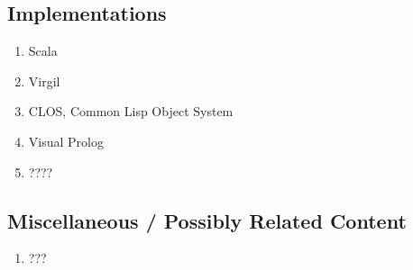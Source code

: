 \documentclass[proposal.tex]{subfiles}
\begin{document}
\subsection{Implementations}
\begin{enumerate}
\item Scala
\item Virgil
\item CLOS, Common Lisp Object System
\item Visual Prolog
\item ????
\end{enumerate}

\subsection{Miscellaneous / Possibly Related Content}
\begin{enumerate}
\item ???
\end{enumerate}
\end{document}
